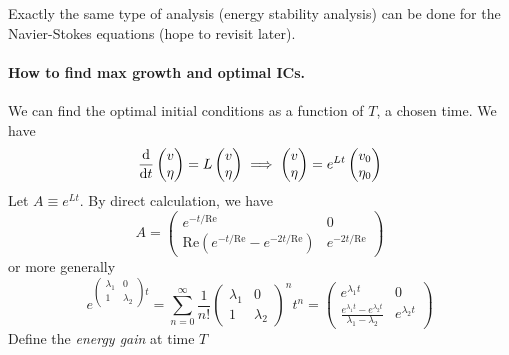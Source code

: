 \documentclass{jknotes}
\newcommand{\ReN}{\text{Re}}
\begin{document}
Exactly the same type of analysis (energy stability analysis) can be done for
the Navier-Stokes equations (hope to revisit later).

\paragraph{How to find max growth and optimal ICs.}
We can find the optimal initial conditions as a function of $T$, a chosen
time. We have
\begin{equation}
	\frac{\diffd}{\diffd t}\begin{pmatrix} v \\ \eta \end{pmatrix} = L
	\begin{pmatrix} v \\ \eta \end{pmatrix} \implies \begin{pmatrix} v \\ \eta
	\end{pmatrix} = e^{Lt} \begin{pmatrix} v_0 \\ \eta_0 \end{pmatrix}
\end{equation}
Let $A \equiv e^{Lt}$. By direct calculation, we have
\begin{equation}
	A = \begin{pmatrix} e^{-t/\ReN} & 0 \\ \ReN(e^{-t/\ReN} - e^{-2t/\ReN}) &
	e^{-2t/\ReN} \end{pmatrix}
\end{equation}
or more generally
\begin{equation}
	e^{\begin{pmatrix} \lambda_1 & 0 \\ 1 & \lambda_2\end{pmatrix}t} =
	\sum_{n=0}^\infty \frac{1}{n!} \begin{pmatrix} \lambda_1 & 0 \\ 1 &
		\lambda_2 \end{pmatrix}^n t^n = \begin{pmatrix} e^{\lambda_1 t} & 0 \\
		\frac{e^{\lambda_1 t} - e^{\lambda_2 t}}{\lambda_1 - \lambda_2} &
		e^{\lambda_2 t} \end{pmatrix}
\end{equation}
Define the \emph{energy gain} at time $T$
\end{document}
